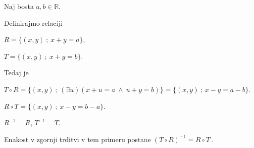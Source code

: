 \documentclass[11pt,paper=b5,DIV=13,headinclude,footinclude]{scrbook}
\newcounter{example}
\def\ali {{~\vee~}}
\def\inn {{~\wedge~}}
\def\sledi {{~\Rightarrow~}}
\def\brez {{\,\setminus\,}}
\def\cee {{~\Leftrightarrow~}}
\begin{document}
\bigskip
\begin{example*}

Naj bosta $a,b\in\mathbb{R}$.

Definirajmo relaciji

$R = \{(x,y)~;~x+y = a\}$,

$T = \{(x,y)~;~x+y = b\}$.

Tedaj je

$T\circ R = \{(x,y)~;~(\exists u)(x+u = a\inn u+y = b)\}=\{(x,y)~;~x-y = a-b\}$.

$R\circ T = \{(x,y)~;~x-y = b-a\}$.

$R^{-1}= R$, $T^{-1} = T$.

Enakost v zgornji trditvi v tem primeru postane
$(T\circ R)^{-1} = R \circ T\,.$
\end{example*}

%
%
%
%
%
%
%
%
%
%
%
%
%
%
%
%
%
%
%
%
%
%
%
%
%
%
%
%
%
%
%
%
%
%
%
\end{document}
